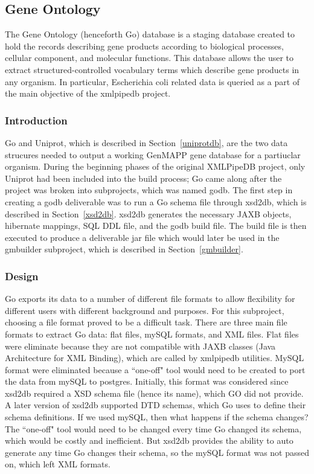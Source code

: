 %


\subsection{Gene Ontology}
The Gene Ontology (henceforth Go) database is a staging database created to hold the records describing gene products according to biological processes,
cellular component, and molecular functions. This database allows the user to extract structured-controlled vocabulary terms
which describe gene products in any organism. In particular, Escherichia coli related data is queried as a part of the main
objective of the xmlpipedb project.

\subsubsection{Introduction}
Go and Uniprot, which is described in Section~\ref{uniprotdb}, are the two data strucures needed to output a
working GenMAPP gene database for a partiuclar organism. During the beginning phases of the original XMLPipeDB project,
only Uniprot had been included into the build process; Go came along after the project was broken into subprojects,
which was named godb. The first step in creating a godb deliverable was to run a Go schema file
through xsd2db, which is described in Section~\ref{xsd2db}. xsd2db generates the necessary JAXB
objects, hibernate mappings, SQL DDL file, and the godb build file. The build file is then executed
to produce a deliverable jar file which  would later be used in the gmbuilder
subproject, which is described in Section~\ref{gmbuilder}.
 

\subsubsection{Design}
\label{godtd}
Go exports its data to a number of different file formats to allow flexibility for different users with
different background and purposes. For this subproject, choosing a file format proved to be a difficult task.
There are three main file formats to extract Go data: flat files, mySQL formats, and XML files. Flat files
were eliminate because they are not compatible with JAXB classes (Java Architecture for XML Binding), which  are called by
xmlpipedb utilities. MySQL format were eliminated because a ``one-off" tool would need
to be created to port the data from mySQL to postgres. Initially, this format was considered since xsd2db
required a XSD
schema file (hence its name), which GO did not provide. A later version of xsd2db supported DTD schemas, which Go uses to define their
schema definitions. If we used mySQL, then what happens if the schema changes? The ``one-off" tool would need to be changed every
time Go changed its schema, which would be costly and inefficient. But xsd2db provides the ability to auto generate any time Go changes
their schema, so the mySQL format was not passed on, which left XML formats.

